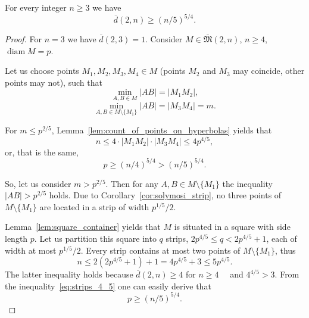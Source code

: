 \documentclass[11pt,twoside,draft
]{article}
\theoremstyle{plain}
\begin{document}
\begin{theorem}
	\label{thm:main_result}
	For every integer $n \geq 3$ we have
	\begin{equation}
		\overline{d}(2,n) \geq (n/5)^{5/4}
		.
	\end{equation}
\end{theorem}

\begin{proof}
	For $n = 3$ we have $\overline{d}(2,3) = 1$.
	Consider $M\in\overline{\mathfrak{M}}(2,n)$, $n \geq 4$, $\operatorname{diam} M = p$.

	Let us choose points $M_1, M_2, M_3, M_4 \in M$
	(points $M_2$ and $M_3$ may coincide, other points may not), such that
	\begin{equation}
		\min_{A, B \in M} |AB| = |M_1 M_2|
		,
	\end{equation}
	\begin{equation}
		\min_{A, B \in M \setminus \{M_1\}} |AB| = |M_3 M_4| = m
		.
	\end{equation}

	For $m \leq p^{2/5}$, Lemma~\ref{lem:count_of_points_on_hyperbolas} yields that
	\begin{equation}
		n \leq 4 \cdot |M_1 M_2| \cdot |M_3 M_4| \leq  4 p^{4/5}
		,
	\end{equation}
	or, that is the same,
	\begin{equation}
		\label{eq:hyperbolas_5_4}
		p \geq (n/4) ^ {5/4} > (n/5) ^ {5/4}
		.
	\end{equation}

	So, let us consider $m > p^{2/5}$.
	Then for any $A,B \in M\setminus\{M_1\}$ the inequality $|AB| > p^{2/5}$ holds.
	Due to Corollary~\ref{cor:solymosi_strip}, no three points of $M\setminus\{M_1\}$
	are located in a strip of width $p^{1/5} / 2$.



	Lemma~\ref{lem:square_container} yields that $M$ is situated in a square with side length $p$.
	Let us partition this square into $q$ strips, $2p^{4/5} \leq q < 2p^{4/5} + 1$, each of width at most $p^{1/5} / 2$.
	Every strip contains at most two points of  $M\setminus\{M_1\}$,
	thus
	\begin{equation}
		\label{eq:strips_4_5}
		n \leq 2(2p^{4/5} + 1) + 1
		= 4p^{4/5}+3
		\leq 5 p^{4/5}
		.
	\end{equation}
	The latter inequality holds because $\overline{d}(2,n) \geq 4$ for $n\geq 4$~~\cite{kurz2008minimum}
	and $4^{4/5}>3$.
	From the inequality~\eqref{eq:strips_4_5} one can easily derive that
	\begin{equation}
		\label{eq:strips_5_4}
		p \geq (n/5) ^ {5/4}
		.
	\end{equation}
\end{proof}
\end{document}
